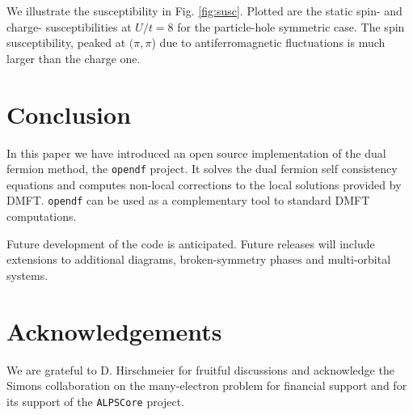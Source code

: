 \documentclass[3p,times,procedia]{elsarticle}
\begin{document}
We illustrate the susceptibility in Fig. \ref{fig:susc}. Plotted are the static spin- and charge- susceptibilities at $U/t = 8$ for the particle-hole symmetric case. The spin susceptibility, peaked at $(\pi,\pi$) due to antiferromagnetic fluctuations is much larger than the charge one. 

\section{Conclusion}\label{sec:conclusions}
In this paper we have introduced an open source implementation of the dual fermion method, the \texttt{opendf} project. It solves the dual fermion self consistency equations and computes non-local corrections to the local solutions provided by DMFT.  \texttt{opendf} can be used as a complementary tool to standard DMFT computations. 

Future development of the code is anticipated. Future releases will include extensions to additional diagrams, broken-symmetry phases and multi-orbital systems. 

\section*{Acknowledgements}
We are grateful to D. Hirschmeier for fruitful discussions and acknowledge the Simons collaboration on the many-electron problem for financial support and for its support of the \texttt{ALPSCore} project.


\end{document}
